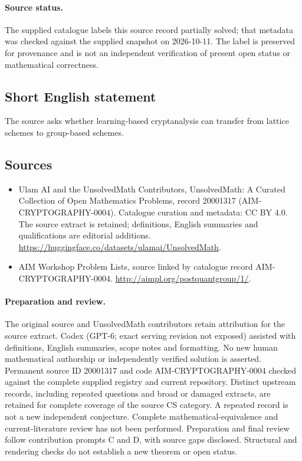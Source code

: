 \documentclass[11pt]{article}
\begin{document}
\paragraph{Source status.}
The supplied catalogue labels this source record partially solved; that metadata was checked against the supplied snapshot on 2026-10-11. The label is preserved for provenance and is not an independent verification of present open status or mathematical correctness.
\subsection{Short English statement}
The source asks whether learning-based cryptanalysis can transfer from lattice schemes to group-based schemes.
\subsection{Sources}
\begin{itemize}
\item[\hypertarget{source:20001317:1}{S1}] Ulam AI and the UnsolvedMath Contributors, UnsolvedMath: A Curated Collection of Open Mathematics Problems, record 20001317 (AIM-CRYPTOGRAPHY-0004). Catalogue curation and metadata: CC BY 4.0. The source extract is retained; definitions, English summaries and qualifications are editorial additions.
\url{https://huggingface.co/datasets/ulamai/UnsolvedMath}.
\item[\hypertarget{source:20001317:2}{S2}] AIM Workshop Problem Lists, source linked by catalogue record AIM-CRYPTOGRAPHY-0004.
\url{http://aimpl.org/postquantgroup/1/}.
\end{itemize}
\paragraph{Preparation and review.}
The original source and UnsolvedMath contributors retain attribution for the source extract. Codex (GPT-6; exact serving revision not exposed) assisted with definitions, English summaries, scope notes and formatting. No new human mathematical authorship or independently verified solution is asserted. Permanent source ID 20001317 and code AIM-CRYPTOGRAPHY-0004 checked against the complete supplied registry and current repository. Distinct upstream records, including repeated questions and broad or damaged extracts, are retained for complete coverage of the source CS category. A repeated record is not a new independent conjecture. Complete mathematical-equivalence and current-literature review has not been performed. Preparation and final review follow contribution prompts C and D, with source gaps disclosed. Structural and rendering checks do not establish a new theorem or open status.
\label{end:20001317}
\end{document}
